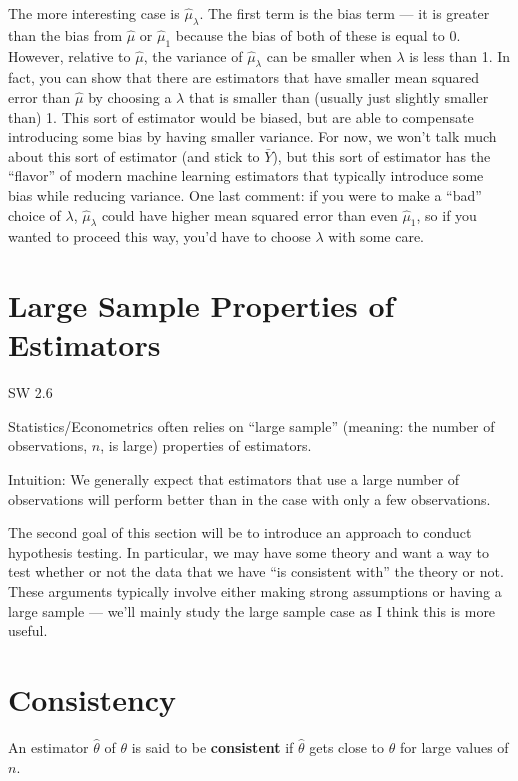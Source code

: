\documentclass[
  letterpaper,
  DIV=11,
  numbers=noendperiod]{scrreprt}
\begin{document}
The more interesting case is \(\hat{\mu}_\lambda\). The first term is
the bias term --- it is greater than the bias from \(\hat{\mu}\) or
\(\hat{\mu}_1\) because the bias of both of these is equal to 0.
However, relative to \(\hat{\mu}\), the variance of
\(\hat{\mu}_\lambda\) can be smaller when \(\lambda\) is less than 1. In
fact, you can show that there are estimators that have smaller mean
squared error than \(\hat{\mu}\) by choosing a \(\lambda\) that is
smaller than (usually just slightly smaller than) 1. This sort of
estimator would be biased, but are able to compensate introducing some
bias by having smaller variance. For now, we won't talk much about this
sort of estimator (and stick to \(\bar{Y}\)), but this sort of estimator
has the ``flavor'' of modern machine learning estimators that typically
introduce some bias while reducing variance. One last comment: if you
were to make a ``bad'' choice of \(\lambda\), \(\hat{\mu}_\lambda\)
could have higher mean squared error than even \(\hat{\mu}_1\), so if
you wanted to proceed this way, you'd have to choose \(\lambda\) with
some care.

\section{Large Sample Properties of
Estimators}\label{large-sample-properties-of-estimators}

SW 2.6

Statistics/Econometrics often relies on ``large sample'' (meaning: the
number of observations, \(n\), is large) properties of estimators.

Intuition: We generally expect that estimators that use a large number
of observations will perform better than in the case with only a few
observations.

The second goal of this section will be to introduce an approach to
conduct hypothesis testing. In particular, we may have some theory and
want a way to test whether or not the data that we have ``is consistent
with'' the theory or not. These arguments typically involve either
making strong assumptions or having a large sample --- we'll mainly
study the large sample case as I think this is more useful.

\section{Consistency}\label{consistency}

An estimator \(\hat{\theta}\) of \(\theta\) is said to be
\textbf{consistent} if \(\hat{\theta}\) gets close to \(\theta\) for
large values of \(n\).
\end{document}
